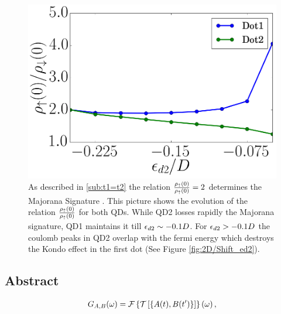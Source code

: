 \documentclass[showpacs,aps,prb,reprint,superscriptaddress]{revtex4-1}
\begin{document}
\begin{figure}[bt]
\centering
\includegraphics[scale=0.3]{Graficos/e2-Fermi.png}
\caption{\label{fig:ed2/Fermi} As described in \ref{sub:t1=t2} the relation $\frac{\rho_\uparrow(0)}{\rho_\uparrow(0)}=2$ determines the Majorana Signature . This picture shows the evolution of the relation $\frac{\rho_\uparrow(0)}{\rho_\uparrow(0)}$ for both QDs. While QD2 losses rapidly the Majorana signature, QD1 maintains it till $\epsilon_{d2}\sim -0.1D$. For  $\epsilon_{d2}>-0.1D$ the coulomb peaks in QD2 overlap with the fermi energy which destroys the Kondo effect in the first dot (See Figure \ref{fig:2D/Shift_ed2}). }

\end{figure}





\subsection{Abstract}
\begin{equation}
  G_{A,B}(\omega)= \mathcal{F}\left\{ \mathcal{T}\left[\left\{ A(t),B(t')\right\} \right]\right\} \left(\omega\right),
  \label{eq:greenFunction}
\end{equation}
\end{document}
